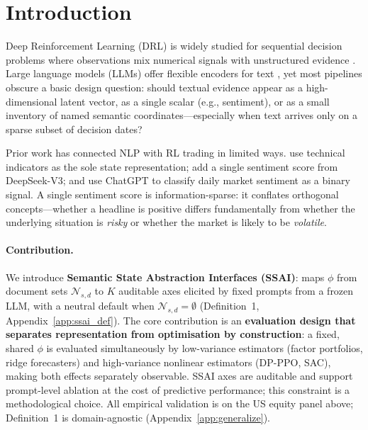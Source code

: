 \documentclass{article}
\begin{document}
\section{Introduction}
\label{sec:intro}

Deep Reinforcement Learning (DRL) is widely studied for sequential decision problems where observations mix numerical signals with unstructured evidence \citep{mnih2015human,schulman2017proximal,liu2021finrl}.
Large language models (LLMs) offer flexible encoders for text \citep{brown2020language,liu2023fingpt,wu2023bloomberggpt}, yet most pipelines obscure a basic design question: should textual evidence appear as a high-dimensional latent vector, as a single scalar (e.g., sentiment), or as a small inventory of named semantic coordinates---especially when text arrives only on a sparse subset of decision dates?

Prior work has connected NLP with RL trading in limited ways.
\citet{yang2020finrl} use technical indicators as the sole state
representation; \citet{benstaf2024finrl_deepseek} add a single
sentiment score from DeepSeek-V3; and \citet{chen2023chatgpt} use
ChatGPT to classify daily market sentiment as a binary signal.
A single sentiment score is information-sparse: it conflates
orthogonal concepts—whether a headline is positive differs fundamentally
from whether the underlying situation is \emph{risky} or whether the
market is likely to be \emph{volatile}.

\paragraph{Contribution.}
We introduce \textbf{Semantic State Abstraction Interfaces (SSAI)}: maps $\phi$ from document sets $\mathcal{N}_{s,d}$ to $K$ auditable axes elicited by fixed prompts from a frozen LLM, with a neutral default when $\mathcal{N}_{s,d}=\emptyset$ (Definition~1, Appendix~\ref{app:ssai_def}).
The core contribution is an \textbf{evaluation design that separates representation from optimisation by construction}: a fixed, shared $\phi$ is evaluated simultaneously by low-variance estimators (factor portfolios, ridge forecasters) and high-variance nonlinear estimators (DP-PPO, SAC), making both effects separately observable.
SSAI axes are auditable and support prompt-level ablation at the cost of predictive performance; this constraint is a methodological choice.
All empirical validation is on the US equity panel above; Definition~1 is domain-agnostic (Appendix~\ref{app:generalize}).
\end{document}

